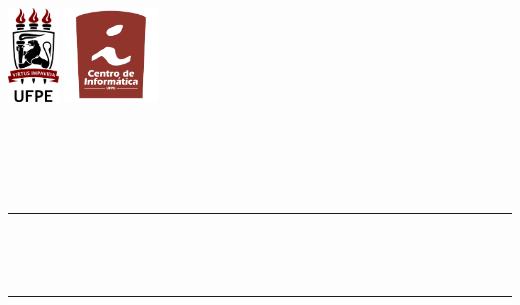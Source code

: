 {\center%
\newcommand{\HRule}{\rule{\linewidth}{0.5mm}} %



\begin{minipage}{\textwidth}
\center
\includegraphics[height=2.5cm]{img/logo-ufpe}
\hspace{\fill}
\includegraphics[height=2.5cm]{img/logo-cin}
\end{minipage}
\\[1.5cm]
 

\textsc{\LARGE \myUniversity}\\[0.5cm] %
\textsc{\Large \myDepartment}\\[0.5cm] %
\textsc{\large \myGraduation}\\[0.5cm] %


\HRule \\[0.4cm]
{ \huge \bfseries \myTitle \\[0.4cm] \par} %
\HRule \\[1.5cm]
 
}
